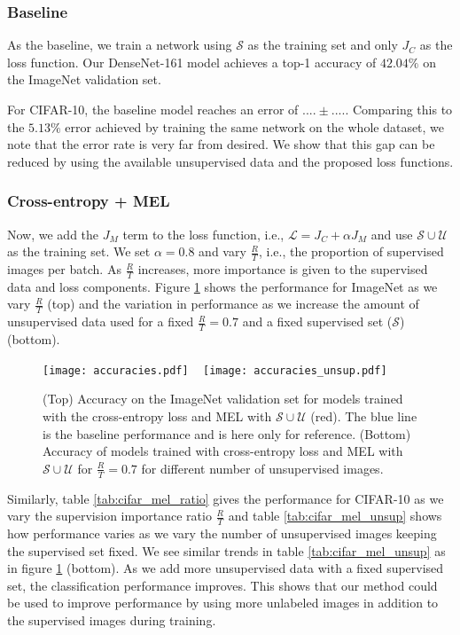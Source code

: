 \subsubsection{Baseline}
As the baseline, we train a network using $\mathcal{S}$ as the training set and only $J_C$ as the loss
function. Our DenseNet-161 model achieves a top-1 accuracy of $42.04\%$ on the ImageNet validation
set. 

For CIFAR-10, the baseline model reaches an error of $.... \pm ....$. Comparing this to the $5.13\%$
error achieved by training the same network on the whole dataset, we note that the error rate is
very far from desired. We show that this gap can be reduced by using the available unsupervised data and
the proposed loss functions. 

\subsubsection{Cross-entropy + MEL}
Now, we add the $J_M$ term to the loss function, i.e., $\mathcal{L} = J_C + \alpha
J_M$ and use $\mathcal{S} \cup \mathcal{U}$ as the training set. We set $\alpha = 0.8$ and vary
$\frac{R}{T}$, i.e., the proportion of supervised images per batch. As $\frac{R}{T}$ increases, more
importance is given to the supervised data and loss components. Figure \ref{fig:acc} shows
the performance for ImageNet as we vary $\frac{R}{T}$ (top) and the variation in performance as we
increase the amount of unsupervised data used for a fixed $\frac{R}{T} = 0.7$ and a fixed supervised
set ($\mathcal{S}$) (bottom). 
\begin{figure}
	\centering
	{
		\texttt{[image: accuracies.pdf]}
	~
		\texttt{[image: accuracies\_unsup.pdf]}
	}
		\caption{(Top) Accuracy on the ImageNet validation set for models trained with the cross-entropy
		loss and MEL with $\mathcal{S}\cup\mathcal{U}$ (red). The blue line is the baseline
		performance and is here only for reference. (Bottom) Accuracy of models trained with
		cross-entropy loss and MEL with $\mathcal{S}\cup\mathcal{U}$ for $\frac{R}{T} = 0.7$ for
	different number of unsupervised images.}
		\label{fig:acc}
\end{figure}

Similarly, table \ref{tab:cifar_mel_ratio} gives the performance for CIFAR-10 as we vary the
supervision importance ratio $\frac{R}{T}$ and table \ref{tab:cifar_mel_unsup} shows how performance
varies as we vary the number of unsupervised images keeping the supervised set fixed. We see similar
trends in table \ref{tab:cifar_mel_unsup} as in figure \ref{fig:acc} (bottom). As we add more
unsupervised data with a fixed supervised set, the classification performance improves. This shows
that our method could be used to improve performance by using more unlabeled images in addition to
the supervised images during training.

